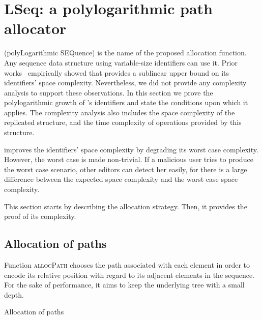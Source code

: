 

\section{LSeq: a polylogarithmic path allocator}
\label{sec:proposal}

\LSEQ (polyLogarithmic SEQuence) is the name of the proposed allocation
function. Any sequence data structure using variable-size identifiers can use
it. Prior works~\cite{nedelec2013concurrency, nedelec2013lseq} empirically
showed that \LSEQ provides a sublinear upper bound on its identifiers' space
complexity. Nevertheless, we did not provide any complexity analysis to support
these observations. In this section we prove the polylogarithmic growth of
\LSEQ's identifiers and state the conditions upon which it applies. The
complexity analysis also includes the space complexity of the replicated
structure, and the time complexity of operations provided by this structure. 

\LSEQ improves the identifiers' space complexity by degrading its worst case
complexity. However, the worst case is made non-trivial. If a malicious user
tries to produce the worst case scenario, other editors can detect her easily,
for there is a large difference between the expected space complexity and the
worst case space complexity.

This section starts by describing the allocation strategy. Then, it
provides the proof of its complexity.

\subsection{Allocation of paths}
\label{subsec:lseqallocation}

Function \textsc{allocPath} chooses the path associated with each element in
order to encode its relative position with regard to its adjacent elements in
the sequence. For the sake of performance, it aims to keep the underlying tree
with a small depth.

\begin{algorithm}

\caption{\label{algo:allocpath}Allocation of paths}
\end{algorithm}

